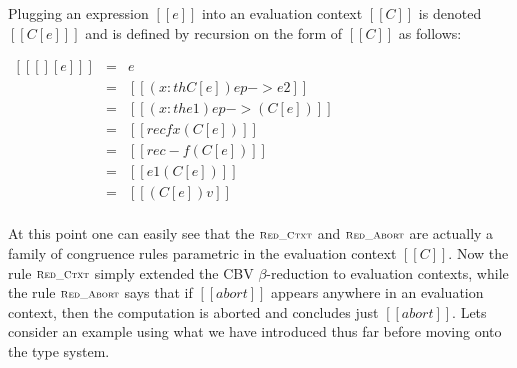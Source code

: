 \begin{definition}
  \label{def:FS-ectx-plug}
  Plugging an expression $[[e]]$ into an evaluation context $[[C]]$ is denoted $[[C[e] ]]$
  and is defined by recursion on the form of $[[C]]$ as follows:
  \begin{center}
    \begin{math}
      \begin{array}{rll}
        [[ [] [e] ]]                    & = & e\\
        [[(( x : th C ) ep -> e2)[e] ]] & = & [[( x : th C[e] ) ep -> e2]]\\
        [[(( x : th e1 ) ep -> C)[e] ]] & = & [[( x : th e1 ) ep -> (C[e]) ]]\\
        [[(rec f x C)[e] ]]             & = & [[rec f x (C[e]) ]]\\
        [[(rec - f C)[e] ]]             & = & [[rec - f (C[e]) ]]\\
        [[(e1 C)[e] ]]                  & = & [[e1 (C[e]) ]]\\
        [[(C v)[e] ]]                   & = & [[(C[e]) v]]\\
      \end{array}
    \end{math}
  \end{center}
\end{definition}
At this point one can easily see that the $\textsc{\scriptsize Red\_Ctxt}$
and $\textsc{\scriptsize Red\_Abort}$ are actually a family of congruence
rules parametric in the evaluation context $[[C]]$. Now the rule
$\textsc{\scriptsize Red\_Ctxt}$ simply extended the CBV $\beta$-reduction to
evaluation contexts, while the rule $\textsc{\scriptsize Red\_Abort}$ says
that if $[[abort]]$ appears anywhere in an evaluation context, then the
computation is aborted and concludes just $[[abort]]$.  Lets consider
an example using what we have introduced thus far before moving onto
the type system.

